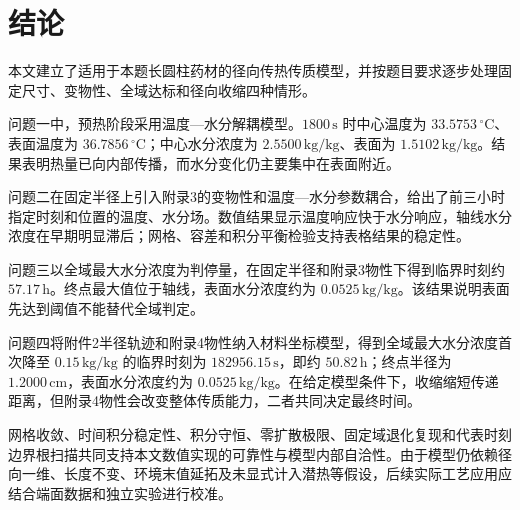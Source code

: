\section{结论}

本文建立了适用于本题长圆柱药材的径向传热传质模型，并按题目要求逐步处理固定尺寸、变物性、全域达标和径向收缩四种情形。

问题一中，预热阶段采用温度—水分解耦模型。$1800\,\mathrm{s}$ 时中心温度为 $33.5753\,{}^\circ\mathrm{C}$、表面温度为 $36.7856\,{}^\circ\mathrm{C}$；中心水分浓度为 $2.5500\,\mathrm{kg/kg}$、表面为 $1.5102\,\mathrm{kg/kg}$。结果表明热量已向内部传播，而水分变化仍主要集中在表面附近。

问题二在固定半径上引入附录3的变物性和温度—水分参数耦合，给出了前三小时指定时刻和位置的温度、水分场。数值结果显示温度响应快于水分响应，轴线水分浓度在早期明显滞后；网格、容差和积分平衡检验支持表格结果的稳定性。

问题三以全域最大水分浓度为判停量，在固定半径和附录3物性下得到临界时刻约 $57.17\,\mathrm{h}$。终点最大值位于轴线，表面水分浓度约为 $0.0525\,\mathrm{kg/kg}$。该结果说明表面先达到阈值不能替代全域判定。

问题四将附件2半径轨迹和附录4物性纳入材料坐标模型，得到全域最大水分浓度首次降至 $0.15\,\mathrm{kg/kg}$ 的临界时刻为 $182956.15\,\mathrm{s}$，即约 $50.82\,\mathrm{h}$；终点半径为 $1.2000\,\mathrm{cm}$，表面水分浓度约为 $0.0525\,\mathrm{kg/kg}$。在给定模型条件下，收缩缩短传递距离，但附录4物性会改变整体传质能力，二者共同决定最终时间。

网格收敛、时间积分稳定性、积分守恒、零扩散极限、固定域退化复现和代表时刻边界根扫描共同支持本文数值实现的可靠性与模型内部自洽性。由于模型仍依赖径向一维、长度不变、环境末值延拓及未显式计入潜热等假设，后续实际工艺应用应结合端面数据和独立实验进行校准。
